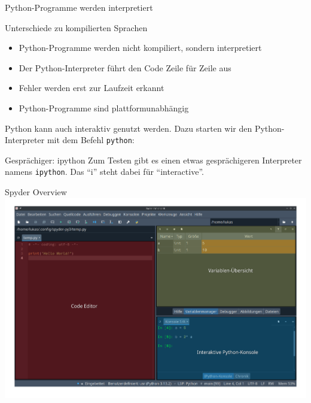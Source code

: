 \documentclass[xelatex,aspectratio=169]{beamer}
\begin{document}
\begin{frame}{Python-Programme werden interpretiert}
  \begin{block}{Unterschiede zu kompilierten Sprachen}
    \begin{itemize}
      \item Python-Programme werden nicht kompiliert, sondern interpretiert
      \item Der Python-Interpreter führt den Code Zeile für Zeile aus
      \item Fehler werden erst zur Laufzeit erkannt
      \item Python-Programme sind plattformunabhängig
    \end{itemize}
  \end{block}

  Python kann auch interaktiv genutzt werden. Dazu starten wir den Python-Interpreter mit dem Befehl \texttt{python}:


\end{frame}

\begin{frame}{Gesprächiger: ipython}
  Zum Testen gibt es einen etwas gesprächigeren Interpreter namens \texttt{ipython}. Das \enquote{i} steht dabei für \enquote{interactive}.

\end{frame}

\begin{frame}[plain,t]{Spyder Overview}
  \vspace{-.65cm}
  \includegraphics[height=\paperheight]{img/spyder_overview.png}
\end{frame}
\end{document}
